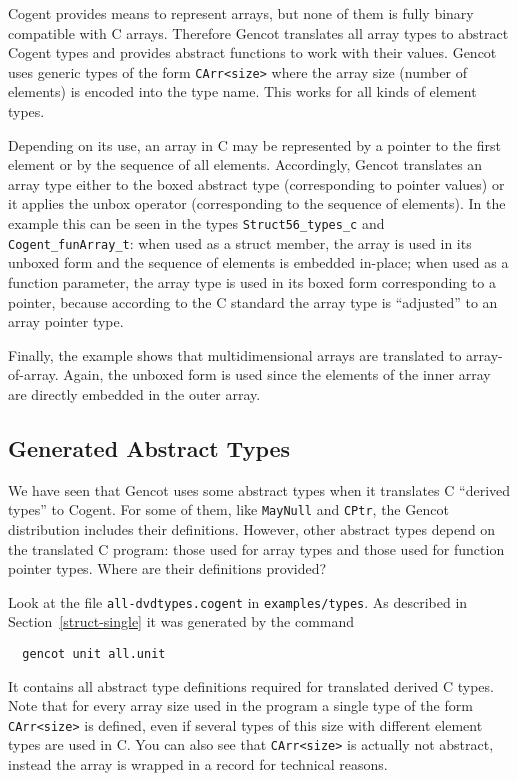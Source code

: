 \documentclass[a4paper]{report}
\newcommand{\code}[1]{\textnormal{\texttt{#1}}}
\begin{document}
Cogent provides means to represent arrays, but none of them is fully binary compatible with C arrays. Therefore Gencot
translates all array types to abstract Cogent types and provides abstract functions to work with their values. Gencot
uses generic types of the form \code{CArr<size>} where the array size (number of elements) is encoded into the type name.
This works for all kinds of element types.

Depending on its use, an array in C may be represented by a pointer to the first element or by the sequence of all elements.
Accordingly, Gencot translates an array type either to the boxed abstract type (corresponding to pointer values) or it
applies the unbox operator (corresponding to the sequence of elements). In the example this can be seen in the types 
\code{Struct56\_types\_c} and \code{Cogent\_funArray\_t}: when used as a struct member, the array is used in its unboxed
form and the sequence of elements is embedded in-place; when used as a function parameter, the array type is used in 
its boxed form corresponding to a pointer, because according to the C standard the array type is ``adjusted'' to an array
pointer type.

Finally, the example shows that multidimensional arrays are translated to array-of-array. Again, the unboxed form is used
since the elements of the inner array are directly embedded in the outer array.

\subsection{Generated Abstract Types}
\label{types-auto-gen}

We have seen that Gencot uses some abstract types when it translates C ``derived types'' to Cogent. For some of them, like 
\code{MayNull} and \code{CPtr}, the Gencot distribution includes their definitions. However, other abstract types
depend on the translated C program: those used for array types and those used for function pointer types. Where
are their definitions provided?

Look at the file \code{all-dvdtypes.cogent} in \code{examples/types}. As described in Section~\ref{struct-single} it was 
generated by the command
\begin{verbatim}
  gencot unit all.unit
\end{verbatim}
It contains all abstract type definitions required for translated derived C types. Note that for every array
size used in the program a single type of the form \code{CArr<size>} is defined, even if several types of this
size with different element types are used in C. You can also see that \code{CArr<size>} is actually not abstract, 
instead the array is wrapped in a record for technical reasons.
\end{document}
